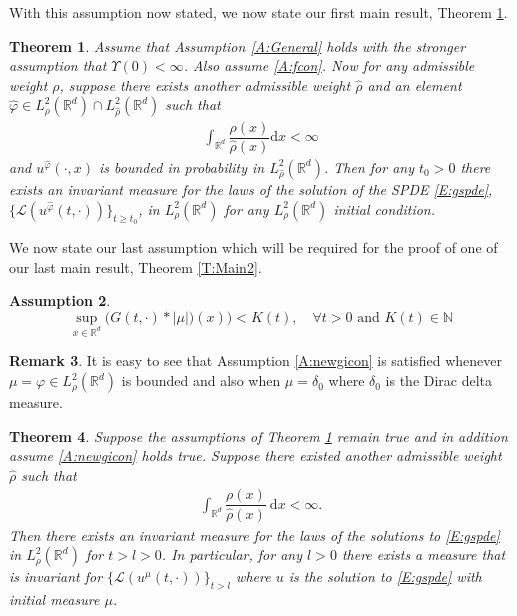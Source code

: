 \documentclass[a4paper,11pt]{article}%
\numberwithin{equation}{section}
\theoremstyle{plain}
\newtheorem{theorem}{Theorem}[section]
\theoremstyle{definition}
\newtheorem{assumptions}[theorem]{Assumption}
\newtheorem{remark}[theorem]{Remark}
\newcommand{\R}{\mathbb{R}}
\newcommand{\ud}{\ensuremath{ \mathrm{d} }}
\begin{document}

With this assumption now stated, we now state our first main result, Theorem \ref{T:Main}.

\begin{theorem}
	\label{T:Main}
	Assume that Assumption \ref{A:General} holds with the stronger assumption that $\Upsilon(0) <\infty$. Also assume \eqref{A:fcon}. Now for any admissible weight $\rho$, suppose there exists another admissible weight $\widehat{\rho}$ and an element $\hat{\varphi} \in L^2_\rho(\R^d) \cap L^2_{\widehat{\rho}}(\R^d)$ such that
	\begin{align*}
		\int_{\R^d}\dfrac{\rho(x)}{\widehat{\rho}(x)}\ud x < \infty
	\end{align*}
	and $u^{\hat\varphi}(\cdot,x)$ is bounded in probability in $L^2_{\widehat{\rho}}(\R^d)$.
	Then for any $t_0 >0$ there exists an invariant measure for the laws of the solution of the SPDE \eqref{E:gspde}, $\{\mathscr L (u^{\hat\varphi}(t,\cdot))\}_{t \ge t_0}$,  in $L^2_\rho(\R^d)$ for any $L^2_{\rho}(\R^d)$ initial condition.
\end{theorem}

We now state our last assumption which will be required for the proof of one of our last main result, Theorem \eqref{T:Main2}.

\begin{assumptions} $\;$
	\begin{equation}
		\sup_{x\in \R^d}	\big(G(t,\cdot)*|\mu|)(x) \big) < K(t), \quad \forall t>0 \text{ and } K(t)\in \mathbb N \label{A:newgicon}
	\end{equation}
\end{assumptions}

\begin{remark}
	It is easy to see that Assumption \eqref{A:newgicon} is satisfied whenever $\mu=\varphi \in L^2_\rho(\R^d)$ is bounded and also when $\mu = \delta_0$ where $\delta_0$ is the Dirac delta measure.
\end{remark}

\begin{theorem}
	\label{T:Main2}
	Suppose the assumptions of Theorem \ref{T:Main} remain true and in addition assume \eqref{A:newgicon} holds true. Suppose there existed
	another admissible weight $\hat{\rho}$ such that
	\begin{align*}
	\int_{\R^d}\dfrac{\rho(x)}{\widehat{\rho}(x)}\: \ud x < \infty.
	\end{align*}
	 Then there exists an invariant measure for the laws of the solutions to
	\eqref{E:gspde} in $L^2_\rho(\R^d)$ for $t>l>0$. In particular, for any $l>0$ there exists a measure that is
	invariant for $\{\mathscr L (u^\mu(t,\cdot))\}_{t>l}$ where $u$ is the solution to \eqref{E:gspde} with
	initial measure $\mu$.
\end{theorem}
\end{document}
